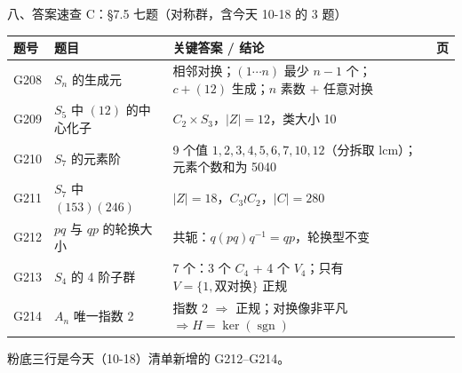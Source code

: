 \documentclass[aspectratio=169,10pt,fontset=none]{ctexbeamer}
\begin{document}
\begin{frame}[t]{八、答案速查 C：\S7.5 七题（对称群，含今天 10-18 的 3 题）}
  \centering
  \scriptsize
  \setlength{\tabcolsep}{3pt}
  \renewcommand{\arraystretch}{1.30}
  \begin{tabular}{@{}l l l c@{}}
    \toprule
    题号 & 题目 & 关键答案 / 结论 & 页\\
    \midrule
    G208 & $S_n$ 的生成元 & 相邻对换；$(1\cdots n)$ 最少 $n-1$ 个；$c+(12)$ 生成；$n$ 素数 $+$ 任意对换 & \pageref{ex:G208}\\
    G209 & $S_5$ 中 $(12)$ 的中心化子 & $C_2\times S_3$，$|Z|=12$，类大小 10 & \pageref{ex:G209}\\
    G210 & $S_7$ 的元素阶 & 9 个值 $1,2,3,4,5,6,7,10,12$（分拆取 lcm）；元素个数和为 5040 & \pageref{ex:G210}\\
    G211 & $S_7$ 中 $(153)(246)$ & $|Z|=18$，$C_3\wr C_2$，$|C|=280$ & \pageref{ex:G211}\\
    \rowcolor{accent!6} G212 & $pq$ 与 $qp$ 的轮换大小 & 共轭：$q(pq)q^{-1}=qp$，轮换型不变 & \pageref{ex:G212}\\
    \rowcolor{accent!6} G213 & $S_4$ 的 4 阶子群 & 7 个：3 个 $C_4$ + 4 个 $V_4$；只有 $V=\{1,\text{双对换}\}$ 正规 & \pageref{ex:G213}\\
    \rowcolor{accent!6} G214 & $A_n$ 唯一指数 2 & 指数 2 $\Rightarrow$ 正规；对换像非平凡 $\Rightarrow H=\ker(\operatorname{sgn})$ & \pageref{ex:G214}\\
    \bottomrule
  \end{tabular}
  \vspace{0.3em}
  {\scriptsize\color{ink!70} 粉底三行是今天（10-18）清单新增的 G212--G214。}
\end{frame}
\end{document}
